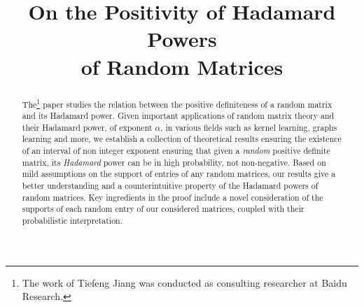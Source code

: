 \documentclass[conference,letterpaper]{IEEEtran}
\numberwithin{equation}{section}
\begin{document}
\title{On the Positivity of Hadamard Powers \\
of Random Matrices}


\author{%
  \and
}



\maketitle


\begin{abstract}
\noindent The\footnote{The work of Tiefeng Jiang was conducted as consulting researcher at Baidu Research.} paper studies the relation between the positive definiteness of a random matrix and its Hadamard power.
Given important applications of random matrix theory and their Hadamard power, of exponent $\alpha$, in various fields such as kernel learning, graphs learning and more, we establish a collection of theoretical results ensuring the existence of an interval of non integer exponent ensuring that given a \emph{random} positive definite matrix, its \emph{Hadamard} power can be in high probability, not non-negative.
Based on mild assumptions on the support of entries of any random matrices, our results give a better understanding and a counterintuitive property of the Hadamard powers of random matrices.
Key ingredients in the proof include a novel consideration of the supports of each random entry of our considered matrices, coupled with their probabilistic interpretation.\\
\end{abstract}
\end{document}
